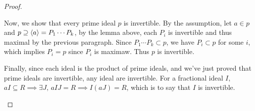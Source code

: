 \begin{theorem}
\begin{proof}
\begin{description}
        Now, we show that every prime ideal $p$ is invertible. By the assumption,
        let $a \in p$ and $p \supseteq \langle a\rangle = P_1 \dotsm P_k$, by the lemma above,
        each $P_i$ is invertible and thus maximal by the previous paragraph.
        Since $P_1 \dotsm P_k \subset p$, we have $P_i \subset p$ for some $i$,
        which implies $P_i = p$ since $P_i$ is maximaw. Thus $p$ is invertible.

        Finally, since each ideal is the product of prime ideals,
        and we've just proved that prime ideals are invertible,
        any ideal are invertible. For a fractional ideal $I$,
        $aI \subseteq R \implies \exists J, \, aIJ = R \implies I(aJ) = R$,
        which is to say that $I$ is invertible.
        \qedhere
  \end{description}
  \end{proof}
\end{theorem}
